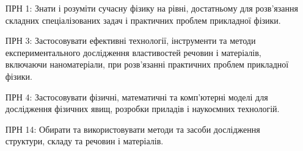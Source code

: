 \documentclass{Syllabus}
\begin{document}
\begin{enumerate}
\item [ПРН 1:] Знати і розуміти сучасну фізику на рівні, достатньому для розв’язання складних спеціалізованих задач і практичних проблем прикладної фізики.
\item [ПРН 3:] Застосовувати ефективні технології, інструменти та методи експериментального дослідження властивостей речовин і матеріалів, включаючи наноматеріали, при розв’язанні практичних проблем прикладної фізики.
\item [ПРН 4:] Застосовувати фізичні, математичні та комп'ютерні моделі для дослідження фізичних явищ, розробки приладів і наукоємних технологій.
\item [ПРН 14:] Обирати та використовувати методи та засоби дослідження структури, складу та речовин і матеріалів.

\end{enumerate}
\end{document}
